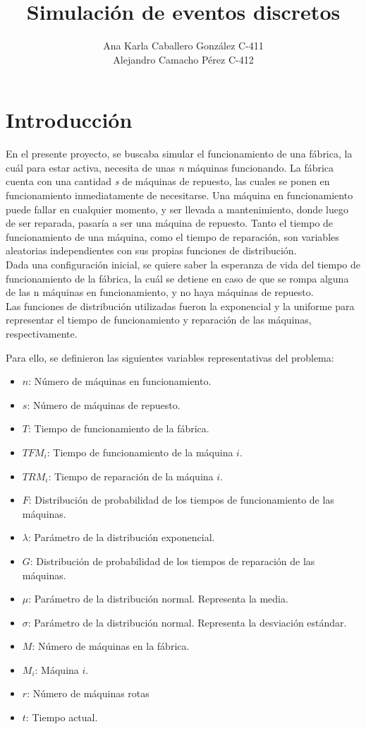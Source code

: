 \documentclass{article}
\title{Simulación de eventos discretos}
\author{Ana Karla Caballero González C-411\\ Alejandro Camacho Pérez C-412}
\begin{document}
\maketitle

\section{Introducción}

En el presente proyecto, se buscaba simular el funcionamiento de una fábrica, la cuál para estar activa, necesita de unas \textit{n} máquinas funcionando. La fábrica cuenta con una cantidad \textit{s} de máquinas de repuesto, las cuales se ponen en funcionamiento inmediatamente de necesitarse. Una máquina en funcionamiento puede fallar en cualquier momento, y ser llevada a mantenimiento, donde luego de ser reparada, pasaría a ser una máquina de repuesto. Tanto el tiempo de funcionamiento de una máquina, como el tiempo de reparación, son variables aleatorias independientes con sus propias funciones de distribución.\\

Dada una configuración inicial, se quiere saber la esperanza de vida del tiempo de funcionamiento de la fábrica, la cuál se detiene en caso de que se rompa alguna de las n máquinas en funcionamiento, y no haya máquinas de repuesto.\\

Las funciones de distribución utilizadas fueron la exponencial y la uniforme para representar el tiempo de funcionamiento y reparación de las máquinas, respectivamente.

Para ello, se definieron las siguientes variables representativas del problema:
\begin{itemize}
    \item $n$: Número de máquinas en funcionamiento.
    \item $s$: Número de máquinas de repuesto.
    \item $T$: Tiempo de funcionamiento de la fábrica.
    \item $TFM_i$: Tiempo de funcionamiento de la máquina $i$.
    \item $TRM_i$: Tiempo de reparación de la máquina $i$.
    \item $F$: Distribución de probabilidad de los tiempos de funcionamiento de las máquinas.
    \item $\lambda$: Parámetro de la distribución exponencial.
    \item $G$: Distribución de probabilidad de los tiempos de reparación de las máquinas.
    \item $\mu$: Parámetro de la distribución normal. Representa la media.
    \item $\sigma$: Parámetro de la distribución normal. Representa la desviación estándar.
    \item $M$: Número de máquinas en la fábrica.
    \item $M_i$: Máquina $i$.
    \item $r$: Número de máquinas rotas
    \item $t$: Tiempo actual.
\end{itemize}
\end{document}

